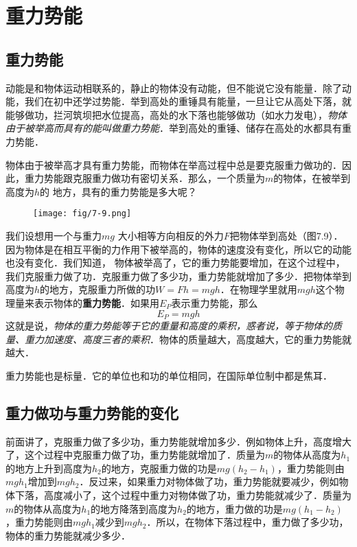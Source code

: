    \section{重力势能}

   \subsection{重力势能}
   
   动能是和物体运动相联系的，静止的物体没有动能，但不能说它没有能量．除了动能，我们在初中还学过势能．举到高处的重锤具有能量，一旦让它从高处下落，就能够做功，拦河筑坝把水位提高，高处的水下落也能够做功（如水力发电），\textit{物体由于被举高而具有的能叫做重力势能}．举到高处的重锤、储存在高处的水都具有重力势能．

    物体由于被举高才具有重力势能，而物体在举高过程中总是要克服重力做功的．因此，重力势能跟克服重力做功有密切关系．那么，一个质量为$m$的物体，在被举到高度为$h$的
    地方，具有的重力势能是多大呢？

\begin{figure}[htp]
\centering\texttt{[image: fig/7-9.png]}
\caption{}
\end{figure}

    我们设想用一个与重力$mg$
    大小相等方向相反的外力$F$把物体举到高处（图7.9）．因为物体是在相互平衡的力作用下被举高的，物体的速度没有变化，所以它的动能也没有变化．我们知道，
物体被举高了，它的重力势能要增加，在这个过程中，我们克服重力做了功．克服重力做了多少功，重力势能就增加了多少．把物体举到高度为$h$的地方，克服重力所做的功$W=Fh=mgh$．在物理学里就用$mgh$这个物理量来表示物体的\textbf{重力势能}．如果用$E_P$表示重力势能，那么
\[E_P =mgh\]
这就是说，\textit{物体的重力势能等于它的重量和高度的乘积，惑者说，等于物体的质量、重力加速度、高度三者的乘积}．物体的质量越大，高度越大，它的重力势能就越大．

重力势能也是标量．它的单位也和功的单位相同，在国际单位制中都是焦耳．

\subsection{重力做功与重力势能的变化}

前面讲了，克服重力做了多少功，重力势能就增加多少．例如物体上升，高度增大了，这个过程中克服重力做了功，重力势能就增加了．质量为$m$的物体从高度为$h_1$的地方上升到高度为$h_2$的地方，克服重力做的功是$mg(h_2-h_1)$，重力势能则由$mgh_1$增加到$mgh_2$．反过来，如果重力对物体做了功，重力势能就要减少，例如物体下落，高度减小了，这个过程中重力对物体做了功，重力势能就减少了．质量为$m$的物体从高度为$h_1$的地方降落到高度为$h_2$的地方，重力做的功是$mg(h_1-h_2)$，重力势能则由$mgh_1$减少到$mgh_2$．所以，在物体下落过程中，重力做了多少功，物体的重力势能就减少多少．


